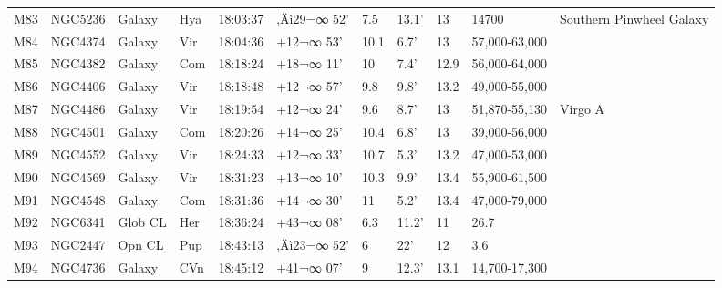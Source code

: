 \documentclass[10pt,twoside,a4paper,english]{report}
\begin{document}
\begin{longtable}{@{}lllllllllll@{}}
M83        & NGC5236     & Galaxy     & Hya       & 18:03:37 & ‚Äì29¬∞ 52'  & 7.5       & 13.1'                & 13       & 14700               & Southern Pinwheel Galaxy                  \\ 
M84        & NGC4374     & Galaxy     & Vir       & 18:04:36 & +12¬∞ 53'  & 10.1      & 6.7'                 & 13       & 57,000-63,000       &                                           \\ 
M85        & NGC4382     & Galaxy     & Com       & 18:18:24 & +18¬∞ 11'  & 10        & 7.4'                 & 12.9     & 56,000-64,000       &                                           \\ 
M86        & NGC4406     & Galaxy     & Vir       & 18:18:48 & +12¬∞ 57'  & 9.8       & 9.8'                 & 13.2     & 49,000-55,000       &                                           \\ 
M87        & NGC4486     & Galaxy     & Vir       & 18:19:54 & +12¬∞ 24'  & 9.6       & 8.7'                 & 13       & 51,870-55,130       & Virgo A                                   \\ 
M88        & NGC4501     & Galaxy     & Com       & 18:20:26 & +14¬∞ 25'  & 10.4      & 6.8'                 & 13       & 39,000-56,000       &                                           \\ 
M89        & NGC4552     & Galaxy     & Vir       & 18:24:33 & +12¬∞ 33'  & 10.7      & 5.3'                 & 13.2     & 47,000-53,000       &                                           \\ 
M90        & NGC4569     & Galaxy     & Vir       & 18:31:23 & +13¬∞ 10'  & 10.3      & 9.9'                 & 13.4     & 55,900-61,500       &                                           \\ 
M91        & NGC4548     & Galaxy     & Com       & 18:31:36 & +14¬∞ 30'  & 11        & 5.2'                 & 13.4     & 47,000-79,000       &                                           \\ 
M92        & NGC6341     & Glob CL    & Her       & 18:36:24 & +43¬∞ 08'  & 6.3       & 11.2'                & 11       & 26.7                &                                           \\ 
M93        & NGC2447     & Opn CL     & Pup       & 18:43:13 & ‚Äì23¬∞ 52'  & 6         & 22'                  & 12       & 3.6                 &                                           \\ 
M94        & NGC4736     & Galaxy     & CVn       & 18:45:12 & +41¬∞ 07'  & 9         & 12.3'                & 13.1     & 14,700-17,300       &                                           \\ 

\end{longtable}
\end{document}
